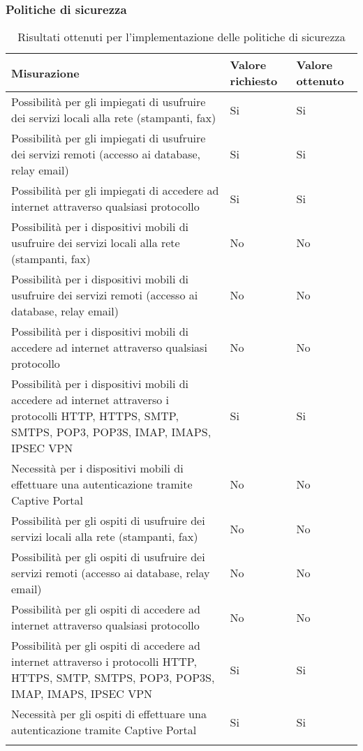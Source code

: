 \documentclass[Tesi.tex]{subfiles}
\begin{document}
\subsubsection{Politiche di sicurezza}
\label{table:Risultati ottenuti per l'implementazione delle politiche di sicurezza}
\renewcommand*{\arraystretch}{1.2}
\begin{longtable}[H]{p{9.5cm}p{3.2cm}p{2cm}}
	\rowcolor{CHeader}
	\color{CHeaderText} \textbf{Misurazione} & \color{CHeaderText} \textbf{Valore richiesto} & \color{CHeaderText} \textbf{Valore ottenuto} \\
	\endhead
	Possibilità per gli impiegati di usufruire dei servizi locali alla rete (stampanti, fax) &
	Si & Si \\
	Possibilità per gli impiegati di usufruire dei servizi remoti (accesso ai database, relay email) &
	Si & Si \\
	Possibilità per gli impiegati di accedere ad internet attraverso qualsiasi protocollo &
	Si & Si \\
	Possibilità per i dispositivi mobili di usufruire dei servizi locali alla rete (stampanti, fax) &
	No & No \\
	Possibilità per i dispositivi mobili di usufruire dei servizi remoti (accesso ai database, relay email) &
	No & No \\
	Possibilità per i dispositivi mobili di accedere ad internet attraverso qualsiasi protocollo &
	No & No \\
	Possibilità per i dispositivi mobili di accedere ad internet attraverso i protocolli HTTP, HTTPS, SMTP, SMTPS, POP3, POP3S, IMAP, IMAPS, IPSEC VPN &
	Si & Si \\
	Necessità per i dispositivi mobili di effettuare una autenticazione tramite Captive Portal &
	No & No \\
	Possibilità per gli ospiti di usufruire dei servizi locali alla rete (stampanti, fax) &
	No & No \\
	Possibilità per gli ospiti di usufruire dei servizi remoti (accesso ai database, relay email) &
	No & No \\
	Possibilità per gli ospiti di accedere ad internet attraverso qualsiasi protocollo &
	No & No \\
	Possibilità per gli ospiti di accedere ad internet attraverso i protocolli HTTP, HTTPS, SMTP, SMTPS, POP3, POP3S, IMAP, IMAPS, IPSEC VPN &
	Si & Si \\
	Necessità per gli ospiti di effettuare una autenticazione tramite Captive Portal &
	Si & Si \\
	\hiderowcolors
	\caption{Risultati ottenuti per l'implementazione delle politiche di sicurezza}
\end{longtable}
\end{document}
